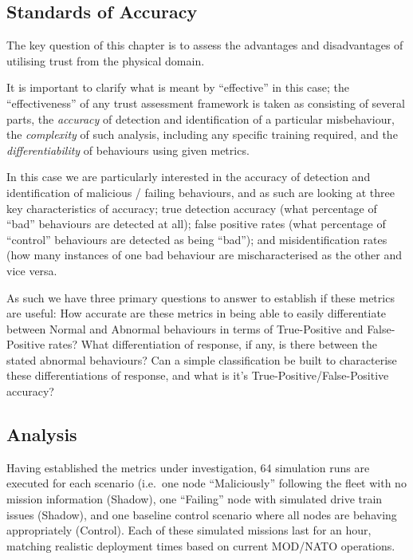 \subsection{Standards of Accuracy}\label{sec:standards}

The key question of this chapter is to assess the advantages and disadvantages of utilising trust from the physical domain. 

It is important to clarify what is meant by ``effective'' in this case; the ``effectiveness'' of any trust assessment framework is taken as consisting of several parts, the \emph{accuracy} of detection and identification of a particular misbehaviour, the \emph{complexity} of such analysis, including any specific training required, and the \emph{differentiability} of behaviours using given metrics.

In this case we are particularly interested in the accuracy of detection and identification of malicious / failing behaviours, and as such are looking at three key characteristics of accuracy; true detection accuracy (what percentage of ``bad'' behaviours are detected at all); false positive rates (what percentage of ``control'' behaviours are detected as being ``bad''); and misidentification rates (how many instances of one bad behaviour are mischaracterised as the other and vice versa.

As such we have three primary questions to answer to establish if these metrics are useful: 
How accurate are these metrics in being able to easily differentiate between Normal and Abnormal behaviours in terms of True-Positive and False-Positive rates?
What differentiation of response, if any, is there between the stated abnormal behaviours?
Can a simple classification be built to characterise these differentiations of response, and what is it's True-Positive/False-Positive accuracy?


\subsection{Analysis}
Having established the metrics under investigation, 64 simulation runs are executed for each scenario (i.e.\ one node ``Maliciously'' following the fleet with no mission information (Shadow), one ``Failing'' node with simulated drive train issues (Shadow), and one baseline control scenario where all nodes are behaving appropriately (Control).
Each of these simulated missions last for an hour, matching realistic deployment times based on current MOD/NATO operations\cite{Bolster2014a}.

